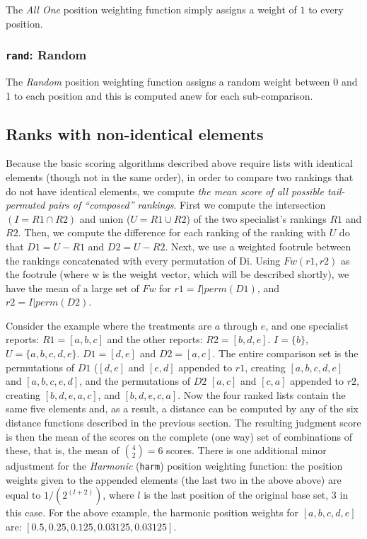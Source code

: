 \documentclass{article}
\begin{document}
The \emph{All One} position weighting function simply assigns a weight of $1$ to every position. 

\subsubsection{\texttt{rand}: Random}

The \emph{Random} position weighting function assigns a random weight between 0 and 1 to each position and this is computed anew for each sub-comparison. 

\subsection{Ranks with non-identical elements}

Because the basic scoring algorithms described above require lists with identical elements (though not in the same order), in order to compare two rankings that do not have identical elements, we compute \textit{the mean score of all possible tail-permuted pairs of ``composed'' rankings}.  First we compute the intersection $(I=R1 \cap R2)$ and union ($U = R1 \cup R2$) of the two specialist's rankings $R1$ and $R2$. Then, we compute the difference for each ranking of the ranking with $U$ do that $D1=U-R1$ and $D2=U-R2$. Next, we use a weighted footrule between the rankings concatenated with every permutation of Di. Using $Fw(r1,r2)$ as the footrule (where w is the weight vector, which will be described shortly), we have the mean of a large set of $Fw$ for $r1 = I|perm(D1)$, and $r2=I|perm(D2)$.

Consider the example where the treatments are $a$ through $e$, and one specialist reports: $R1=[a,b,c]$ and the other reports: $R2=[b,d,e]$. $I=\{b\}$, $U=\{a,b,c,d,e\}$. $D1=[d,e]$ and $D2=[a,c]$. The entire comparison set is the permutations of $D1$ ($[d, e]$ and $[e, d]$ appended to $r1$, creating $[a,b,c,d,e]$ and $[a,b,c,e,d]$, and the permutations of $D2$ $[a, c]$ and $[c, a]$ appended to $r2$, creating  $[b,d,e,a,c]$, and $[b,d,e,c,a]$. Now the four ranked lists contain the same five elements and, as a result, a distance can be computed by any of the six distance functions described in the previous section. The resulting judgment score is then the mean of the scores on the complete (one way) set of combinations of these, that is, the mean of ${4 \choose 2}=6$ scores. There is one additional minor adjustment for the \emph{Harmonic} (\texttt{harm}) position weighting function: the position weights given to the appended elements (the last two in the above above) are equal to $1/(2^{(l+2)})$, where $l$ is the last position of the original base set, 3 in this case. For the above example, the harmonic position weights for $[a,b,c,d,e]$ are: $[0.5, 0.25,0.125,0.03125,0.03125]$.    
\end{document}
